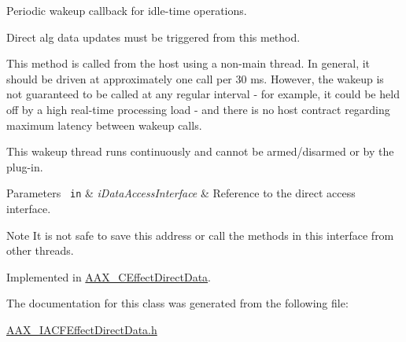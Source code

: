 Periodic wakeup callback for idle-\/time operations. 

Direct alg data updates must be triggered from this method.

This method is called from the host using a non-\/main thread. In general, it should be driven at approximately one call per 30 ms. However, the wakeup is not guaranteed to be called at any regular interval -\/ for example, it could be held off by a high real-\/time processing load -\/ and there is no host contract regarding maximum latency between wakeup calls.

This wakeup thread runs continuously and cannot be armed/disarmed or by the plug-\/in.


\begin{DoxyParams}[1]{Parameters}
\mbox{\texttt{ in}}  & {\em i\+Data\+Access\+Interface} & Reference to the direct access interface.\\
\hline
\end{DoxyParams}
\begin{DoxyNote}{Note}
It is not safe to save this address or call the methods in this interface from other threads. 
\end{DoxyNote}


Implemented in \mbox{\hyperlink{a01473_a3ed665cfbece195524e208e61b4d1937}{A\+A\+X\+\_\+\+C\+Effect\+Direct\+Data}}.



The documentation for this class was generated from the following file\+:\begin{DoxyCompactItemize}
\item 
\mbox{\hyperlink{a00524}{A\+A\+X\+\_\+\+I\+A\+C\+F\+Effect\+Direct\+Data.\+h}}\end{DoxyCompactItemize}
